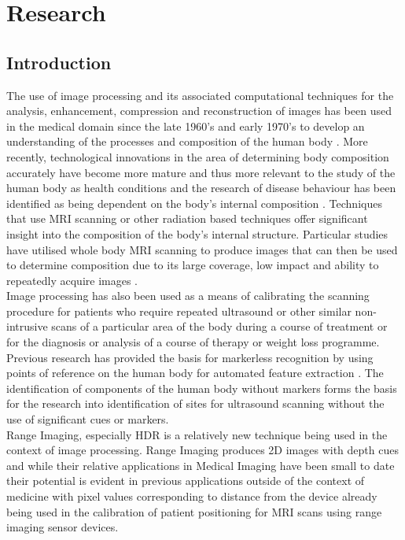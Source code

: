 \chapter{Research}

\label{research}

\section{Introduction}

The use of image processing and its associated computational techniques for the analysis, enhancement, compression and reconstruction of images has been used in the medical domain since the late 1960's and early 1970's to develop an understanding of the processes and composition of the human body \cite{Various2000}. 
More recently, technological innovations in the area of determining body composition accurately have become more mature \cite{Weyers2000} and thus more relevant to the study of the human body as health conditions and the research of disease behaviour has been identified as being dependent on the body's internal composition \cite{Steinkamp1968}. 
Techniques that use MRI scanning or other radiation based techniques offer significant insight into the composition of the body's internal structure. 
Particular studies have utilised whole body MRI scanning to produce images that can then be used to determine composition due to its large coverage, low impact and ability to repeatedly acquire images \cite{Kullberg2010}. \\

Image processing has also been used as a means of calibrating the scanning procedure for patients who require repeated ultrasound or other similar non-intrusive scans of a particular area of the body during a course of treatment or for the diagnosis or analysis of a course of therapy or weight loss programme. 
Previous research has provided the basis for markerless recognition by using points of reference on the human body for automated feature extraction \cite{Iat-FaiLeong2007}. 
The identification of components of the human body without markers forms the basis for the research into identification of sites for ultrasound scanning without the use of significant cues or markers.\\

Range Imaging, especially HDR is a relatively new technique being used in the context of image processing. 
Range Imaging produces 2D images with depth cues and while their relative applications in Medical Imaging have been small to date their potential is evident in previous applications outside of the context of medicine with pixel values corresponding to distance from the device already being used in the calibration of patient positioning for MRI scans using range imaging sensor devices.\\

